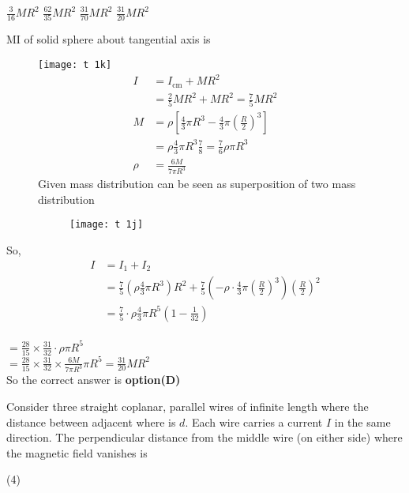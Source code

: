 \begin{questions}
\begin{tasks}
	\task[\textbf{A.}]   $\frac{3}{16} M R^{2}$
	\task[\textbf{B.}] $\frac{62}{35} M R^{2}$
	\task[\textbf{C.}] $\frac{31}{70} M R^{2}$
	\task[\textbf{D.}] $\frac{31}{20} M R^{2}$
\end{tasks}
\begin{answer}
	MI of solid sphere about tangential axis is
	\begin{figure}[H]
		\centering
		\texttt{[image: t 1k]}
	$$
	\begin{aligned}
	I &=I_{\mathrm{cm}}+M R^{2} \\
	&=\frac{2}{5} M R^{2}+M R^{2}=\frac{7}{5} M R^{2} \\
	M &=\rho\left[\frac{4}{3} \pi R^{3}-\frac{4}{3} \pi\left(\frac{R}{2}\right)^{3}\right] \\
	&=\rho \frac{4}{3} \pi R^{3} \frac{7}{8}=\frac{7}{6} \rho \pi R^{3} \\
	\rho &=\frac{6 M}{7 \pi R^{3}}
	\end{aligned}
	$$
	Given mass distribution can be seen as superposition of two mass distribution
	\begin{figure}[H]
		\centering
		\texttt{[image: t 1j]}
	\end{figure}
	\end{figure}
So,
$$
\begin{aligned}
I &=I_{1}+I_{2} \\
&=\frac{7}{5}\left(\rho \frac{4}{3} \pi R^{3}\right) R^{2}+\frac{7}{5}\left(-\rho \cdot \frac{4}{3} \pi\left(\frac{R}{2}\right)^{3}\right)\left(\frac{R}{2}\right)^{2} \\
&=\frac{7}{5} \cdot \rho \frac{4}{3} \pi R^{5}\left(1-\frac{1}{32}\right)
\end{aligned}
$$\\
$=\frac{28}{15} \times \frac{31}{32} \cdot \rho \pi R^{5}$\\
$=\frac{28}{15} \times \frac{31}{32} \times \frac{6 M}{7 \pi R^{3}} \pi R^{5}=\frac{31}{20} M R^{2}$\\
	So the correct answer is \textbf{option(D)}
\end{answer}
\begin{minipage}{\textwidth}
	\question   Consider three straight coplanar, parallel wires of infinite length where the distance between adjacent where is $d$. Each wire carries a current $I$ in the same direction. The perpendicular distance from the middle wire (on either side) where the magnetic field vanishes is
\end{minipage}
\begin{tasks}(4)

\end{tasks}
\end{questions}
